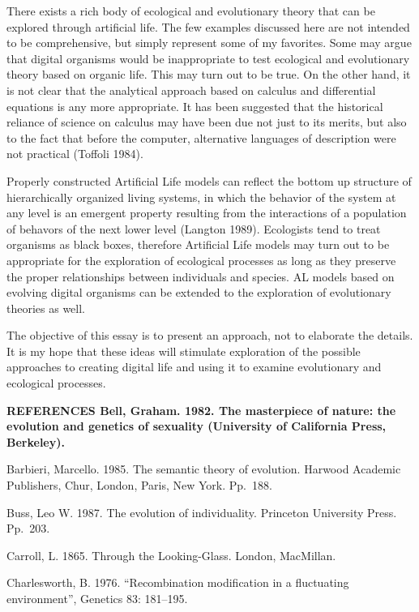 There exists a rich body of ecological and evolutionary theory that
can be explored through artificial life.  The few examples discussed
here are not intended to be comprehensive, but simply represent some
of my favorites.  Some may argue that digital organisms would be
inappropriate to test ecological and evolutionary theory based on
organic life.  This may turn out to be true.  On the other hand, it
is not clear that the analytical approach based on calculus and differential
equations is any more appropriate.  It has been suggested that the
historical reliance of science on calculus may have been due not just
to its merits, but also to the fact that before the computer, alternative
languages of description were not practical (Toffoli 1984).

Properly constructed Artificial Life models can reflect the bottom up
structure of hierarchically organized living systems, in which the
behavior of the system at any level is an emergent property resulting
from the interactions of a population of behavors of the next lower level
(Langton 1989).  Ecologists tend to treat organisms as black boxes, therefore
Artificial Life models may turn out to be appropriate for the exploration
of ecological processes as long as they preserve the proper relationships
between individuals and species.  AL models based on evolving digital
organisms can be extended to the exploration of evolutionary theories as
well.

The objective of this essay is to present an approach, not to elaborate
the details.  It is my hope that these ideas will stimulate exploration
of the possible approaches to creating digital life and using it to examine
evolutionary and ecological processes.

\newpage

\LP
\bf REFERENCES\rm
\eLP
\XP
Bell, Graham.  1982.  The masterpiece of nature: the evolution and genetics
of sexuality (University of California Press, Berkeley).

Barbieri, Marcello.  1985.  The semantic theory of evolution.  Harwood
Academic Publishers, Chur, London, Paris, New York.  Pp.\ 188.

Buss, Leo W.  1987.  The evolution of individuality.  Princeton University
Press.  Pp.\ 203.

Carroll, L.  1865.  Through the Looking-Glass.  London, MacMillan.

Charlesworth, B.  1976. ``Recombination modification in a fluctuating
environment'', Genetics 83: 181--195.

